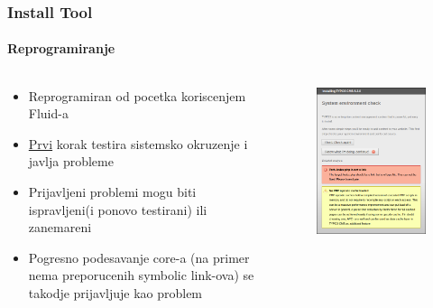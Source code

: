 \begin{frame}[fragile]
	\frametitle{Install Tool}
	\framesubtitle{Reprogramiranje}

	\begin{columns}[T]

		\begin{column}{.5\textwidth}
			\begin{itemize}
				\item Reprogramiran od pocetka koriscenjem Fluid-a
				\item \underline{Prvi} korak testira sistemsko okruzenje i javlja probleme
				\item Prijavljeni problemi mogu biti ispravljeni\newline (i ponovo testirani) ili zanemareni
				\item Pogresno podesavanje core-a (na primer nema preporucenih symbolic link-ova) se takodje prijavljuje kao problem
			\end{itemize}
		\end{column}

		\begin{column}{.5\textwidth}
			\begin{figure}\vspace*{-0.4cm}
				\includegraphics[width=0.8\linewidth]{Images/InstallTool/SystemEnvironmentCheck.png}
			\end{figure}
		\end{column}

	\end{columns}

\end{frame}

